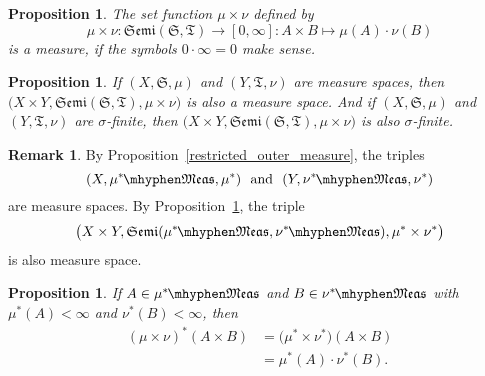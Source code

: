 \documentclass[
twoside=true,
paper=letter,
fontsize=11pt,
pagesize=auto,
leqno,
openany,
headsepline,
overfullrule,
]{scrbook}
\theoremstyle{plain}
\theoremstyle{plain}
\newtheorem{prop}[thm]{Proposition}
\theoremstyle{definition}
\newtheorem{rmk}[thm]{Remark}
\theoremstyle{bfnoteitalic}
\theoremstyle{bfnoteroman}
\newcommand{\sigalg}[1]{\mathfrak{#1}}
\newcommand{\textsigma}{\hbox{\large{$\sigma$}}\kern-1pt}
\newcommand{\semiring}{\sigalg{S}}
\newcommand{\semiringii}{\sigalg{T}}
\newcommand{\productsemiring}[2]{\mathfrak{Semi}(#1,#2)}
\newcommand{\measurable}[1]{{#1}\mhyphen\mathfrak{Meas}}
\newcommand{\kernast}{\ast\kern-1pt}
\newcommand{\measurespace}{X}
\newcommand{\measurespaceii}{Y}
\newcommand{\measure}{\mu}
\newcommand{\measureii}{\nu}
\newcommand{\seti}{A}
\newcommand{\setii}{B}
\begin{document}
 

 
 
 
 


 
 

 
 
 
\begin{prop}\label{product_measure}
The set function $\measure\times\measureii$ defined by
\[
\measure\times\measureii : 
\productsemiring{\semiring}{\semiringii} \to [0, \infty] :
\seti\times\setii \mapsto \measure(\seti)\cdot\measureii(\setii)
\]
is a measure, if the symbols $0\cdot\infty = 0$ make sense.
\end{prop}


\begin{prop}\label{product_measure_space}
If $(\measurespace, \semiring, \measure)$
and
$(\measurespaceii, \semiringii, \measureii)$
are measure spaces, then 
$\bigl(\measurespace\times\measurespaceii, 
\productsemiring{\semiring}{\semiringii}, 
\measure\times\measureii\bigr)$
is also a measure space.
And if
$(\measurespace, \semiring, \measure)$
and
$(\measurespaceii, \semiringii, \measureii)$ 
are \textsigma\hyp{}finite, then 
$\bigl(\measurespace\times\measurespaceii, 
\productsemiring{\semiring}{\semiringii}, 
\measure\times\measureii\bigr)$ is also \textsigma\hyp{}finite.
\end{prop}


\begin{rmk}
By Proposition~\ref{restricted_outer_measure}, the triples
\[
(\measurespace, \measurable{\measure^\kernast}, 
\measure^*)
\ \text{ and }\
(\measurespaceii, \measurable{\measureii^\kernast}, 
\measureii^*)
\]
are measure spaces. 
By Proposition~\ref{product_measure_space}, the triple
\[
\bigl(\measurespace\times\measurespaceii, 
\productsemiring{\measurable{\measure^\kernast}}{\measurable{\measureii^\kernast}}, 
\measure^*
\times
\measureii^*\bigr)
\]
is also measure space. 
\end{rmk}



\begin{prop}\label{outer_product_measure}
If $\seti\in\measurable{\measure^\kernast}$ and 
$\setii\in\measurable{\measureii^\kernast}$ with  
$\measure^*(\seti)<\infty$ and
$\measureii^*(\setii)<\infty$, then
\begin{align*}
(\measure\times\measureii)^*(\seti\times\setii)
&=
\bigl(
\measure^*
\times
\measureii^*
\bigr)
(\seti\times\setii)\\
&=
\measure^*(\seti)
\cdot
\measureii^*(\setii).
\end{align*}
\end{prop}
\end{document}
